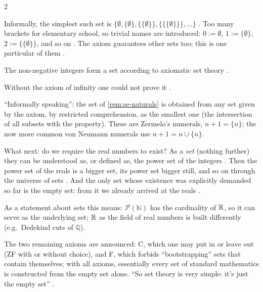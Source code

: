 \begin{paracol}{2}
\begin{remark}\label{rem:se-naturals}
Informally, the simplest such set is $\bigl\{\emptyset,\{\emptyset\},\{\{\emptyset\}\},\{\{\{\emptyset\}\}\},\dots\bigr\}$
. Too many brackets for elementary school, so trivial names are introduced:
$0:=\emptyset$, $1:=\{\emptyset\}$, $2:=\{\{\emptyset\}\}$, and so on . The axiom guarantees
other sets too; this is one particular of them .
\end{remark}

\begin{corollary}\label{cor:se-N}
The non-negative integers form a set according to axiomatic set theory .
\end{corollary}
Without the axiom of infinity one could not prove it .
\begin{coursenote}
``Informally speaking'': the set of \cref{rem:se-naturals} is obtained from any set given by the axiom, by
restricted comprehension, as the smallest one (the intersection of all subsets with the property). These are
Zermelo's numerals, $n+1=\{n\}$; the now more common von Neumann numerals use $n+1=n\cup\{n\}$.
\end{coursenote}

What next: do we require the real numbers to exist? As a \emph{set} (nothing further) they can be understood as, or
defined as, the power set of the integers . Then the power set of the reals is a bigger
set, its power set bigger still, and so on through the universe of sets . And the only set
whose existence was explicitly demanded so far is the empty set: from it we already arrived at the reals
.
\begin{coursenote}
As a statement about sets this means: $\mathcal P(\mathbb N)$ has the cardinality of $\mathbb{R}$, so it can serve as the
underlying set; $\mathbb{R}$ as the field of real numbers is built differently (e.g.\ Dedekind cuts of $\mathbb Q$).
\end{coursenote}

The two remaining axioms are announced: C, which one may put in or leave out (ZF with or without choice), and F,
which forbids ``bootstrapping'' sets that contain themselves; with all axioms, essentially every set of standard
mathematics is constructed from the empty set alone. ``So set theory is very simple: it's just the empty set''
.


\end{paracol}
